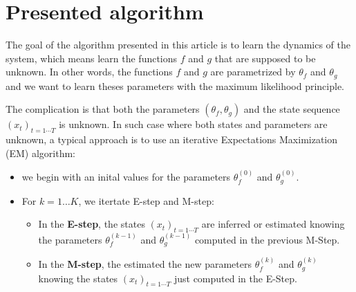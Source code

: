 \section{Presented algorithm}

The goal of the algorithm presented in this article is to learn the dynamics of the system, which means learn the functions $f$ and $g$ that are supposed to be unknown.
In other words, the functions $f$ and $g$ are parametrized by $\theta_f$ and $\theta_g$ and we want to learn theses parameters with the maximum likelihood principle.

The complication is that both the parameters $(\theta_f, \theta_g)$ and the state sequence $(x_t)_{t=1 \cdots T}$ is unknown.
In such case where both states and parameters are unknown, a typical approach is to use an iterative Expectations Maximization (EM) algorithm:
\begin{itemize}
  \item we begin with an inital values for the parameters $\theta_f^{(0)}$ and $\theta_g^{(0)}$.
\item For $k=1 \ldots K$, we itertate E-step and M-step:
  \begin{itemize}
    \item In the \textbf{E-step}, the states $(x_t)_{t=1 \cdots T}$ are inferred or estimated knowing the parameters $\theta_f^{(k-1)}$ and $\theta_g^{(k-1)}$ computed in the previous M-Step.
    \item In the \textbf{M-step}, the estimated the new parameters $\theta_f^{(k)}$ and $\theta_g^{(k)}$ knowing the states $(x_t)_{t=1 \cdots T}$ just computed in the E-Step.
  \end{itemize}
\end{itemize}
